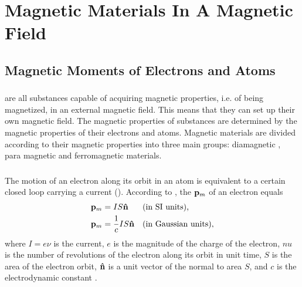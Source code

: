 





\chapter{Magnetic Materials In A Magnetic Field}
\label{ch-26}

\section{Magnetic Moments of Electrons and Atoms}
\label{sec-26.1}


\subsection{}\label{26.1.1}  are all substances capable of acquiring magnetic properties, i.e. of being magnetized, in an external magnetic field. This means that they can set up their own magnetic field. The magnetic properties of substances are determined by the magnetic properties of their electrons and atoms. Magnetic materials are divided according to their magnetic properties into three main groups: diamagnetic , para­ magnetic  and ferromagnetic  materials. 

\subsection{}\label{26.1.2} The motion of an electron along its orbit in an atom is equivalent to a certain closed loop carrying a current (). According to , the  $\vb{p}_{m}$ of an electron equals 
\begin{align*}%
\vb{p}_{m} & = IS \vu{n} && \text{(in SI units),} \\
\vb{p}_{m} & =  \frac{1}{c} IS \vu{n} && \text{(in Gaussian units)},
\end{align*}
where $I = e\nu$ is the current, $e$ is the magnitude of the charge of the electron, $nu$ is the number of revolutions of the electron along its orbit in unit time, $S$ is the area of the electron orbit, $\vu{n}$ is a unit vector of the normal to area $S$, and $c$ is the electrodynamic constant .

